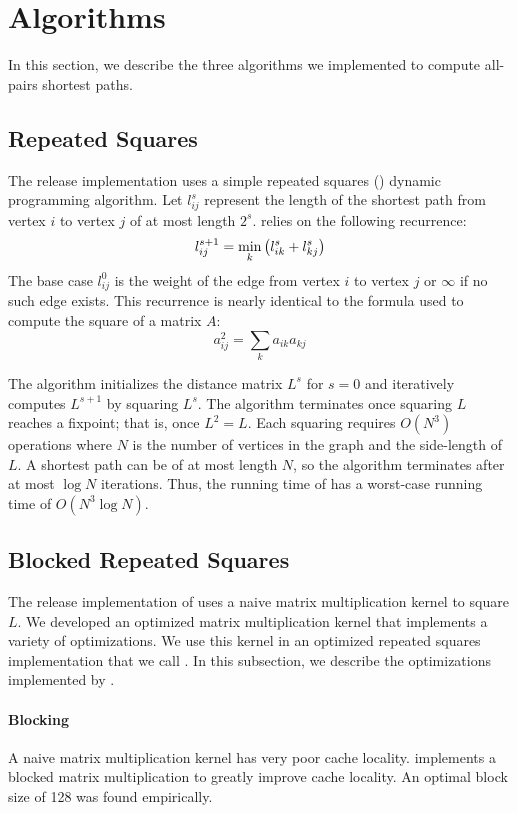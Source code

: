 \section{Algorithms}\label{sec:algo}
In this section, we describe the three algorithms we implemented to compute
all-pairs shortest paths.

\subsection{Repeated Squares}
The release implementation uses a simple repeated squares (\rs) dynamic
programming algorithm. Let $l_{ij}^s$ represent the length of the shortest path
from vertex $i$ to vertex $j$ of at most length $2^s$. \rs{} relies on the
following recurrence:
\[
  l_{ij}^{s+1} = \min_k \left({l_{ik}^s + l_{kj}^s}\right)
\]
The base case $l_{ij}^0$ is the weight of the edge from vertex $i$ to vertex
$j$ or $\infty$ if no such edge exists. This recurrence is nearly identical to
the formula used to compute the square of a matrix $A$:
\[
  a_{ij}^2 = \sum_k a_{ik} a_{kj}
\]

The algorithm initializes the distance matrix $L^s$ for $s=0$ and iteratively
computes $L^{s+1}$ by squaring $L^s$. The algorithm terminates once squaring
$L$ reaches a fixpoint; that is, once $L^2 = L$. Each squaring requires
$O(N^3)$ operations where $N$ is the number of vertices in the graph and the
side-length of $L$. A shortest path can be of at most length $N$, so the
algorithm terminates after at most $\log N$ iterations. Thus, the running time
of \rs{} has a worst-case running time of $O(N^3 \log N)$.

\subsection{Blocked Repeated Squares}
The release implementation of \rs{} uses a naive matrix multiplication kernel
to square $L$. We developed an optimized matrix multiplication kernel that
implements a variety of optimizations. We use this kernel in an optimized
repeated squares implementation that we call \block{}. In this subsection, we
describe the optimizations implemented by \block{}.

\paragraph{Blocking}
A naive matrix multiplication kernel has very poor cache locality. \block{}
implements a blocked matrix multiplication to greatly improve cache locality.
An optimal block size of 128 was found empirically.

